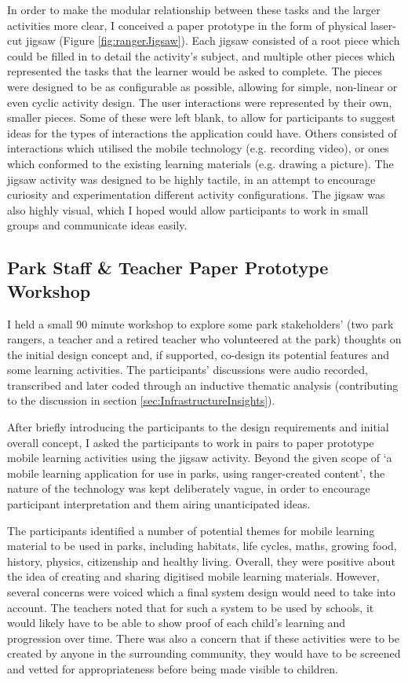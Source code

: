 In order to make the modular relationship between these tasks and the larger activities more clear, I conceived a paper prototype in the form of physical laser-cut jigsaw (Figure \ref{fig:rangerJigsaw}). Each jigsaw consisted of a root piece which could be filled in to detail the activity’s subject, and multiple other pieces which represented the tasks that the learner would be asked to complete. The pieces were designed to be as configurable as possible, allowing for simple, non-linear or even cyclic activity design. The user interactions were represented by their own, smaller pieces. Some of these were left blank, to allow for participants to suggest ideas for the types of interactions the application could have. Others consisted of interactions which utilised the mobile technology (e.g. recording video), or ones which conformed to the existing learning materials (e.g. drawing a picture). The jigsaw activity was designed to be highly tactile, in an attempt to encourage curiosity and experimentation different activity configurations. The jigsaw was also highly visual, which I hoped would allow participants to work in small groups and communicate ideas easily.

\subsection{Park Staff \& Teacher Paper Prototype Workshop}
\label{sec:PrototypeWorkshop}

I held a small 90 minute workshop to explore some park stakeholders’ (two park rangers, a teacher and a retired teacher who volunteered at the park) thoughts on the initial design concept and, if supported, co-design its potential features and some learning activities. The participants' discussions were audio recorded, transcribed and later coded through an inductive thematic analysis (contributing to the discussion in section \ref{sec:InfrastructureInsights}).

After briefly introducing the participants to the design requirements and initial overall concept, I asked the participants to work in pairs to paper prototype mobile learning activities using the jigsaw activity. Beyond the given scope of `a mobile learning application for use in parks, using ranger-created content', the nature of the technology was kept deliberately vague, in order to encourage participant interpretation and them airing unanticipated ideas.

The participants identified a number of potential themes for mobile learning material to be used in parks, including habitats, life cycles, maths, growing food, history, physics, citizenship and healthy living. Overall, they were positive about the idea of creating and sharing digitised mobile learning materials. However, several concerns were voiced which a final system design would need to take into account. The teachers noted that for such a system to be used by schools, it would likely have to be able to show proof of each child’s learning and progression over time. There was also a concern that if these activities were to be created by anyone in the surrounding community, they would have to be screened and vetted for appropriateness before being made visible to children.

